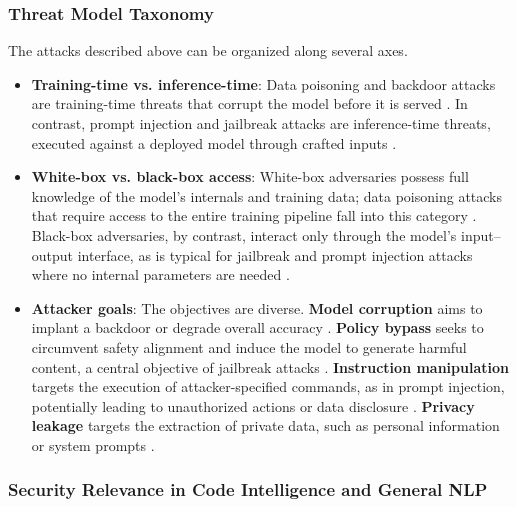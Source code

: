 \documentclass[11pt,a4paper]{article}
\begin{document}
\subsubsection{Threat Model Taxonomy}

The attacks described above can be organized along several axes.

\begin{itemize}
  \item \textbf{Training-time vs. inference-time}: Data poisoning and backdoor attacks are training-time threats that corrupt the model before it is served \cite{Souly_2025_LLMs_4e3c2e97}. In contrast, prompt injection and jailbreak attacks are inference-time threats, executed against a deployed model through crafted inputs \cite{Kim_2025_LLM_2523db75}.
  \item \textbf{White-box vs. black-box access}: White-box adversaries possess full knowledge of the model's internals and training data; data poisoning attacks that require access to the entire training pipeline fall into this category \cite{Li_2024_Badedit_b5ba8f82}. Black-box adversaries, by contrast, interact only through the model's input--output interface, as is typical for jailbreak and prompt injection attacks where no internal parameters are needed \cite{Kim_2025_LLM_2523db75}.
  \item \textbf{Attacker goals}: The objectives are diverse. \textbf{Model corruption} aims to implant a backdoor or degrade overall accuracy \cite{Souly_2025_LLMs_4e3c2e97}. \textbf{Policy bypass} seeks to circumvent safety alignment and induce the model to generate harmful content, a central objective of jailbreak attacks \cite{Kim_2025_LLM_2523db75}. \textbf{Instruction manipulation} targets the execution of attacker-specified commands, as in prompt injection, potentially leading to unauthorized actions or data disclosure \cite{Zhang_2025_AI_647785c1}. \textbf{Privacy leakage} targets the extraction of private data, such as personal information or system prompts \cite{Wang_2024_LLMs_a70eec1a}.
\end{itemize}
\subsubsection{Security Relevance in Code Intelligence and General NLP}
\end{document}
